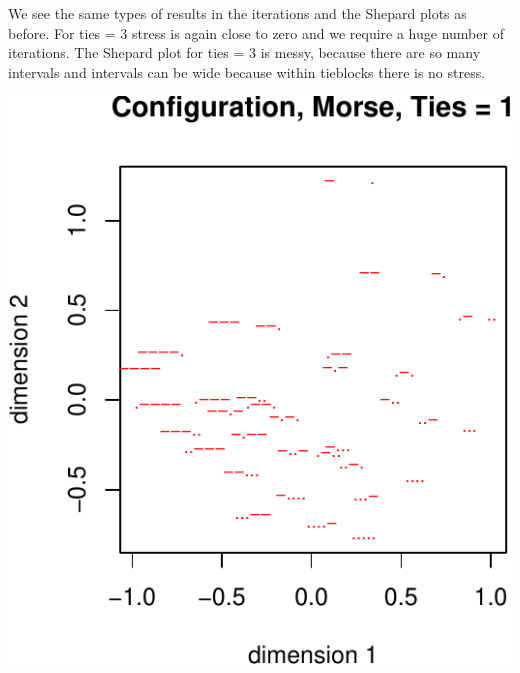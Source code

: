\documentclass[
  12pt,
]{article}
\begin{document}
We see the same types of results in the iterations and the Shepard plots as before. For ties = 3
stress is again close to zero and we require a huge number of iterations. The Shepard plot
for ties = 3 is messy, because there are so many intervals and intervals can be wide because
within tieblocks there is no stress.

\begin{center}\includegraphics{smacofRO_files/figure-latex/plotmorseconfs-1} \end{center}
\end{document}
